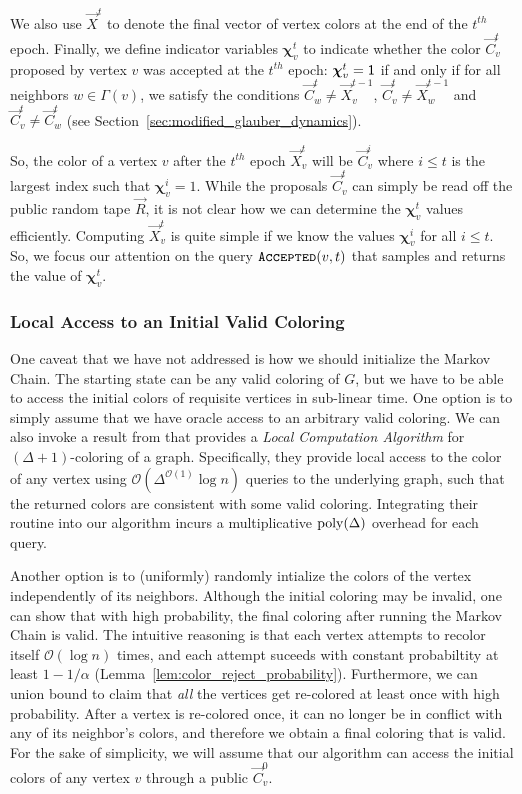 We also use $\vec X^t$ to denote the final vector of vertex colors at the end of the $t^{th}$ epoch.
Finally, we define indicator variables $\bm \chi^t_v$ to indicate whether the color $\vec C^t_v$ proposed by vertex $v$
was accepted at the $t^{th}$ epoch: $\bm \chi^t_v = \mathsf{1}$ if and only if for all neighbors $w\in \Gamma(v)$,
we satisfy the conditions $\vec C^t_w\not= \vec X^{t-1}_v$, $\vec C^t_v\not= \vec X^{t-1}_w$ and $\vec C^t_v\not= \vec C^t_w$
(see Section~\ref{sec:modified_glauber_dynamics}).

So, the color of a vertex $v$ after the $t^{th}$ epoch $\vec X^t_v$ will be $\vec C^i_v$
where $i\le t$ is the largest index such that $\bm \chi^i_v=1$.
While the proposals $\vec C^t_v$ can simply be read off the public random tape $\vec R$,
it is not clear how we can determine the $\bm \chi^t_v$ values efficiently.
Computing $\vec X^t_v$ is quite simple if we know the values $\bm\chi^i_v$ for all $i\le t$.
So, we focus our attention on the query $\texttt{\textsc{Accepted}}(v,t)$ that samples and returns the value of $\bm\chi^t_v$.


\subsubsection{Local Access to an Initial Valid Coloring}
\label{sec:local_access_to_an_initial_valid_coloring}
One caveat that we have not addressed is how we should initialize the Markov Chain.
The starting state can be any valid coloring of $G$, but we have to be able to access the initial colors of requisite vertices in sub-linear time.
One option is to simply assume that we have oracle access to an arbitrary valid coloring.
We can also invoke a result from \cite{coloring_initialize} that provides a \emph{Local Computation Algorithm} for $(\Delta+1)$-coloring of a graph.
Specifically, they provide local access to the color of any vertex using $\mathcal O(\Delta^{\mathcal O(1)}\log n)$ queries to the underlying graph,
such that the returned colors are consistent with some valid coloring.
Integrating their routine into our algorithm incurs a multiplicative $\mathrm{poly}(\Delta)$ overhead for each query.

Another option is to (uniformly) randomly intialize the colors of the vertex independently of its neighbors.
Although the initial coloring may be invalid, one can show that with high probability, the final coloring after running the Markov Chain is valid.
The intuitive reasoning is that each vertex attempts to recolor itself $\mathcal O(\log n)$ times,
and each attempt suceeds with constant probabiltity at least $1 - 1/\alpha$ (Lemma~\ref{lem:color_reject_probability}).
Furthermore, we can union bound to claim that \emph{all} the vertices get re-colored at least once with high probability.
After a vertex is re-colored once, it can no longer be in conflict with any of its neighbor's colors,
and therefore we obtain a final coloring that is valid.
For the sake of simplicity, we will assume that our algorithm can access the initial colors of any vertex $v$ through a public $\vec C^0_v$.

